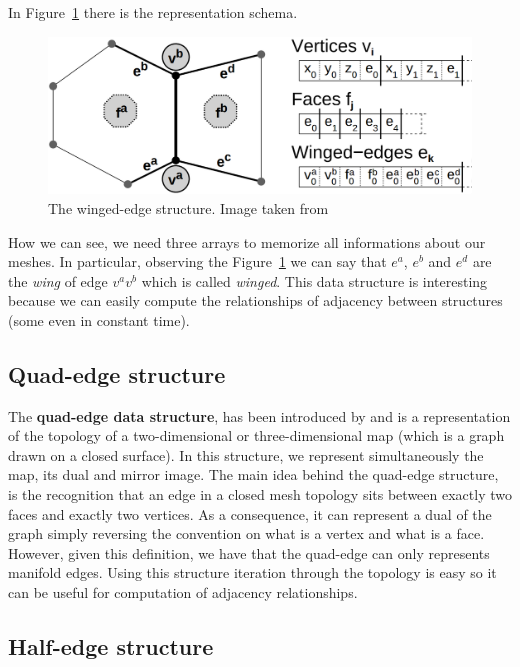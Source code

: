 In Figure~\ref{fig:winged-edge} there is the representation schema.

\begin{figure}[htb] %
   \centering
   \includegraphics[width=0.60\linewidth]{images/winged-edge.png}
   \caption[The winged-edge structure]{The winged-edge structure. Image taken from~\cite{Campagna}}
   \label{fig:winged-edge}
\end{figure}

How we can see, we need three arrays to memorize all informations about our meshes. In particular, observing the Figure~\ref{fig:winged-edge} we can say that $e^a$, $e^b$ and $e^d$ are the \textit{wing} of edge $v^{a}v^{b}$ which is called \textit{winged}. This data structure is interesting because we can easily compute the relationships of adjacency between structures (some even in constant time).


\subsection{Quad-edge structure}

The \textbf{quad-edge data structure}, has been introduced by \cite{Guibas} and is a representation of the topology of a two-dimensional or three-dimensional map (which is a graph drawn on a closed surface). In this structure, we represent simultaneously the map, its dual and mirror image. The main idea behind the quad-edge structure, is the recognition that an edge in a closed mesh topology sits between exactly two faces and exactly two vertices. As a consequence, it can represent a dual of the graph simply reversing the convention on what is a vertex and what is a face. However, given this definition, we have that the quad-edge can only represents manifold edges. Using this structure iteration through the topology is easy so it can be useful for computation of adjacency relationships.

\subsection{Half-edge structure}

